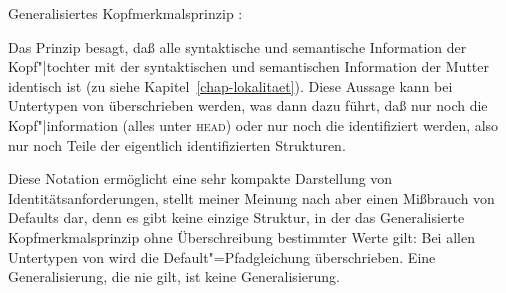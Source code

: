 \eas
Generalisiertes Kopfmerkmalsprinzip \citep[]{GSag2000a-u}:\\
 \impl
{}
\zs


\noindent
Das Prinzip besagt, daß alle syntaktische und semantische Information der Kopf"|tochter
mit der syntaktischen und semantischen Information der Mutter identisch ist (zu \synsem
siehe Kapitel~\ref{chap-lokalitaet}). Diese Aussage kann bei Untertypen von  überschrieben werden,
was dann dazu führt, daß \zb nur noch die Kopf"|information (alles unter \textsc{head}) oder nur
noch die \subcatwe identifiziert werden, also nur noch Teile der eigentlich identifizierten
Strukturen.

Diese Notation ermöglicht eine sehr kompakte Darstellung von Identitätsanforderungen, stellt
meiner Meinung nach aber einen Mißbrauch von Defaults dar, denn es gibt keine einzige Struktur,
in der das Generalisierte Kopfmerkmalsprinzip ohne Überschreibung bestimmter Werte gilt: Bei allen Untertypen von 
wird die Default"=Pfadgleichung überschrieben. Eine Generalisierung, die nie gilt, ist keine Generalisierung.


